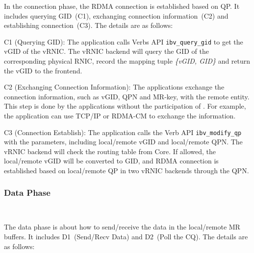 In the connection phase, the RDMA connection is established based on QP. It includes querying GID~(C1), exchanging connection information~(C2) and establishing connection~(C3). The details are as follows:

C1 (Querying GID): The application calls Verbs API \texttt{ibv\_query\_gid} to get the vGID of the vRNIC. The vRNIC backend will query the GID of the corresponding physical RNIC, record the mapping tuple \textit{\{vGID, GID\}} and return the vGID to the frontend.

C2 (Exchanging Connection Information): The applications exchange the connection information, such as vGID, QPN and MR-key, with the remote entity. This step is done by the applications without the participation of \sys. For example, the application can use TCP/IP or RDMA-CM to exchange the information.

C3 (Connection Establish): The application calls the Verb API \texttt{ibv\_modify\_qp} with the parameters, including local/remote vGID and local/remote QPN. The vRNIC backend will check the routing table from \sys Core. If allowed, the local/remote vGID will be converted to GID, and RDMA connection is established based on local/remote QP in two vRNIC backends through the QPN.


\subsubsection{\textbf{Data Phase}}
\
\noindent

The data phase is about how to send/receive the data in the local/remote MR buffers. It includes D1~(Send/Recv Data) and D2~(Poll the CQ). The details are as follows:

